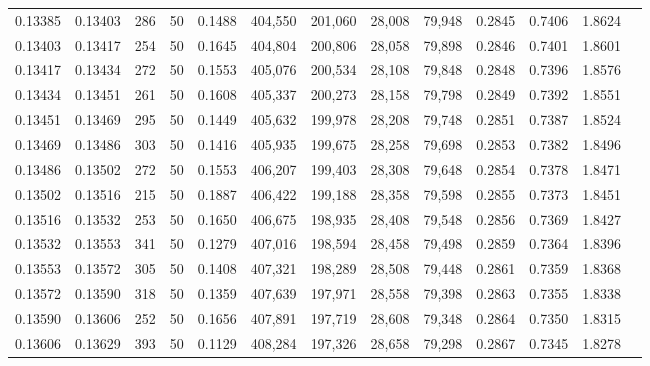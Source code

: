 \begin{tabular}{rrrrrrrrrrrrr}
0.13385 & 0.13403 &   286 &  50 &                                     0.1488 & 404,550 & 201,060 &  28,008 &  79,948 & 0.2845 & 0.7406 & 1.8624 \\
0.13403 & 0.13417 &   254 &  50 &                                     0.1645 & 404,804 & 200,806 &  28,058 &  79,898 & 0.2846 & 0.7401 & 1.8601 \\
0.13417 & 0.13434 &   272 &  50 &                                     0.1553 & 405,076 & 200,534 &  28,108 &  79,848 & 0.2848 & 0.7396 & 1.8576 \\
0.13434 & 0.13451 &   261 &  50 &                                     0.1608 & 405,337 & 200,273 &  28,158 &  79,798 & 0.2849 & 0.7392 & 1.8551 \\
0.13451 & 0.13469 &   295 &  50 &                                     0.1449 & 405,632 & 199,978 &  28,208 &  79,748 & 0.2851 & 0.7387 & 1.8524 \\
0.13469 & 0.13486 &   303 &  50 &                                     0.1416 & 405,935 & 199,675 &  28,258 &  79,698 & 0.2853 & 0.7382 & 1.8496 \\
0.13486 & 0.13502 &   272 &  50 &                                     0.1553 & 406,207 & 199,403 &  28,308 &  79,648 & 0.2854 & 0.7378 & 1.8471 \\
0.13502 & 0.13516 &   215 &  50 &                                     0.1887 & 406,422 & 199,188 &  28,358 &  79,598 & 0.2855 & 0.7373 & 1.8451 \\
0.13516 & 0.13532 &   253 &  50 &                                     0.1650 & 406,675 & 198,935 &  28,408 &  79,548 & 0.2856 & 0.7369 & 1.8427 \\
0.13532 & 0.13553 &   341 &  50 &                                     0.1279 & 407,016 & 198,594 &  28,458 &  79,498 & 0.2859 & 0.7364 & 1.8396 \\
0.13553 & 0.13572 &   305 &  50 &                                     0.1408 & 407,321 & 198,289 &  28,508 &  79,448 & 0.2861 & 0.7359 & 1.8368 \\
0.13572 & 0.13590 &   318 &  50 &                                     0.1359 & 407,639 & 197,971 &  28,558 &  79,398 & 0.2863 & 0.7355 & 1.8338 \\
0.13590 & 0.13606 &   252 &  50 &                                     0.1656 & 407,891 & 197,719 &  28,608 &  79,348 & 0.2864 & 0.7350 & 1.8315 \\
0.13606 & 0.13629 &   393 &  50 &                                     0.1129 & 408,284 & 197,326 &  28,658 &  79,298 & 0.2867 & 0.7345 & 1.8278 \\

\end{tabular}

